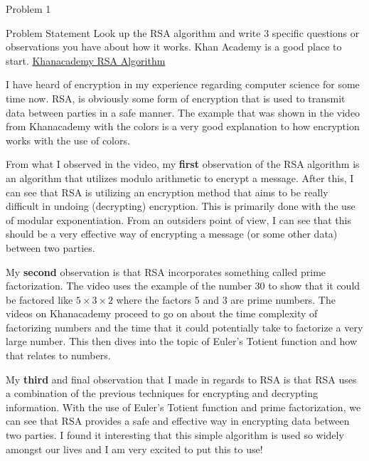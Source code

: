 \begin{problem}{Problem 1}
    \begin{statement}{Problem Statement}
        Look up the RSA algorithm and write 3 specific questions or observations you have about how it works. Khan Academy is a good place to start.
        \href{https://www.khanacademy.org/computing/computer-science/cryptography/modern-crypt/v/intro-to-rsa-encryption}{Khanacademy RSA Algorithm}
    \end{statement}

    \begin{highlight}[Summary]
        I have heard of encryption in my experience regarding computer science for some time now. RSA, is obviously some form of encryption that is used to transmit data between parties in a safe manner.
        The example that was shown in the video from Khanacademy with the colors is a very good explanation to how encryption works with the use of colors. 

        From what I observed in the video, my \textbf{first} observation of the RSA algorithm is an algorithm that utilizes modulo arithmetic to encrypt a message. After this, I can see that RSA is 
        utilizing an encryption method that aims to be really difficult in undoing (decrypting) encryption. This is primarily done with the use of modular exponentiation. From an outsiders point of view, 
        I can see that this should be a very effective way of encrypting a message (or some other data) between two parties. 

        My \textbf{second} observation is that RSA incorporates something called prime factorization. The video uses the example of the number 30 to show that it could be factored like $5 \times 3 \times 2$ 
        where the factors 5 and 3 are prime numbers. The videos on Khanacademy proceed to go on about the time complexity of factorizing numbers and the time that it could potentially take to factorize a 
        very large number. This then dives into the topic of Euler's Totient function and how that relates to numbers.

        My \textbf{third} and final observation that I made in regards to RSA is that RSA uses a combination of the previous techniques for encrypting and decrypting information. With the use of Euler's 
        Totient function and prime factorization, we can see that RSA provides a safe and effective way in encrypting data between two parties. I found it interesting that this simple algorithm is used so 
        widely amongst our lives and I am very excited to put this to use!
    \end{highlight}
\end{problem}

